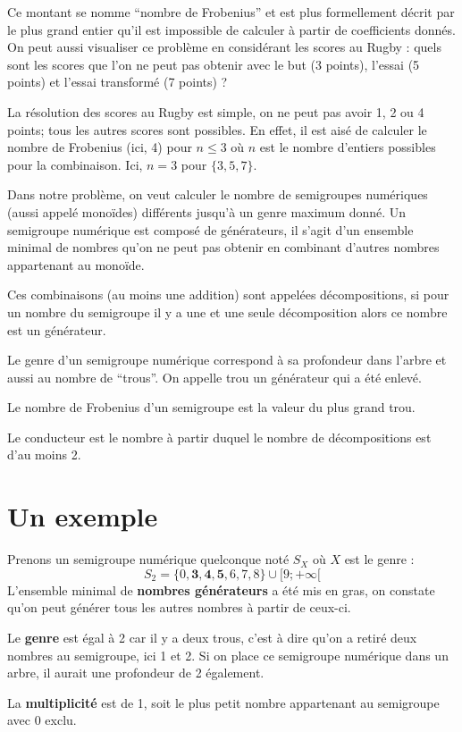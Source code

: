 \documentclass[12pt,a4paper]{report}
\let\leq\leqslant
\begin{document}
Ce montant se nomme ``nombre de Frobenius'' et est plus formellement décrit par le plus grand entier qu'il est impossible de calculer à partir de coefficients donnés. On peut aussi visualiser ce problème en considérant les scores au Rugby : quels sont les scores que l'on ne peut pas obtenir avec le but (3 points), l'essai (5 points) et l'essai transformé (7 points) ?

La résolution des scores au Rugby est simple, on ne peut pas avoir 1, 2 ou 4 points; tous les autres scores sont possibles. En effet, il est aisé de calculer le nombre de Frobenius (ici, 4) pour $n \leq 3$ où $n$ est le nombre d'entiers possibles pour la combinaison. Ici, $n = 3$ pour $\{3,5,7\}$.

Dans notre problème, on veut calculer le nombre de semigroupes numériques (aussi appelé monoïdes) différents jusqu'à un genre maximum donné. Un semigroupe numérique est composé de générateurs, il s'agit d'un ensemble minimal de nombres qu'on ne peut pas obtenir en combinant d'autres nombres appartenant au monoïde.

Ces combinaisons (au moins une addition) sont appelées décompositions, si pour un nombre du semigroupe il y a une et une seule décomposition alors ce nombre est un générateur.

Le genre d'un semigroupe numérique correspond à sa profondeur dans l'arbre et aussi au nombre de ``trous''. On appelle trou un générateur qui a été enlevé.

Le nombre de Frobenius d'un semigroupe est la valeur du plus grand trou.

Le conducteur est le nombre à partir duquel le nombre de décompositions est d'au moins 2.

\section{Un exemple}
Prenons un semigroupe numérique quelconque noté $S_X$ où $X$ est le genre :
\[ S_2 = \{0, \mathbf{3}, \mathbf{4}, \mathbf{5}, 6, 7, 8\} \cup [9; +\infty[ \]
L'ensemble minimal de \textbf{nombres générateurs} a été mis en gras, on constate qu'on peut générer tous les autres nombres à partir de ceux-ci.

Le \textbf{genre} est égal à 2 car il y a deux trous, c'est à dire qu'on a retiré deux nombres au semigroupe, ici 1 et 2. Si on place ce semigroupe numérique dans un arbre, il aurait une profondeur de 2 également.

La \textbf{multiplicité} est de 1, soit le plus petit nombre appartenant au semigroupe avec 0 exclu.
\end{document}
